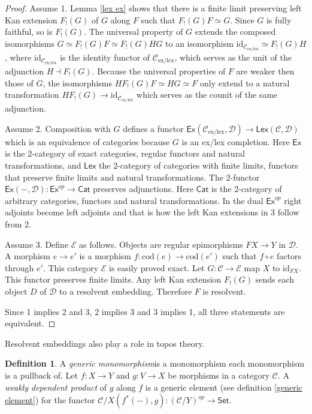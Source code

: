 \documentclass[sort&compress,draft]{elsarticle}
\theoremstyle{plain}
\theoremstyle{definition}
\newtheorem{definition}[theorem]{Definition}
\theoremstyle{remark}
\newcommand\hide[1]{}
\newcommand\key[1]{\emph{#1}\label{#1}}
\newcommand\cat\mathcal
\newcommand\exlex{_\mathrm{ex/lex}}\newcommand\exreg{_\mathrm{ex/reg}}
\newcommand\of:
\newcommand\ri{^*}
\newcommand\id{\mathrm{id}}
\newcommand\cod{\mathrm{cod}}
\newcommand\di{_!}
\newcommand\Cat\mathsf
\newcommand\dual{^{op}}
\newcommand\Set{\Cat{Set}}
\begin{document}
\begin{proof} 
Assume 1. Lemma \ref{lex ex} shows that there is a finite limit preserving left Kan extension $F\di(G)$ of $G$ along $F$ such that $F\di(G)F\simeq G$. Since $G$ is fully faithful, so is $F\di(G)$. The universal property of $G$ extends the composed isomorphisms $G \simeq F\di(G)F\simeq F\di(G)HG$ to an isomorphism $\id_{\cat C\exlex}\simeq F\di(G)H$, where $\id_{\cat C\exlex}$ is the identity functor of $\cat C\exlex$, which serves as the unit of the adjunction $H \dashv F\di(G)$. Because the universal properties of $F$ are weaker then those of $G$, the isomorphisms $HF\di(G)F\simeq HG\simeq F$ only extend to a natural transformation $HF\di(G)\to \id_{\cat C\exlex}$ which serves as the counit of the same adjunction.

Assume 2. Composition with $G$ defines a functor $\Cat{Ex}(\cat C\exlex,\cat D)\to\Cat{Lex}(\cat C,\cat D)$ which is an equivalence of categories because $G$ is an ex/lex completion. Here $\Cat{Ex}$ is the 2-category of exact categories, regular functors and natural transformations, and $\Cat{Lex}$ the 2-category of categories with finite limits, functors that preserve finite limits and natural transformations. The 2-functor $\Cat{Ex}(-,\cat D)\of\Cat{Ex}\dual\to\Cat{Cat}$ preserves adjunctions. Here $\Cat{Cat}$ is the 2-category of arbitrary categories, functors and natural transformations. In the dual $\Cat{Ex}\dual$ right adjoints become left adjoints and that is how the left Kan extensions in 3 follow from 2.
\hide{Is this acceptable? Would it (not) be better to move everything to the 2-categorical level?}

Assume 3. Define $\cat E$ as follows. Objects are regular epimorphisms $FX\to Y$ in $\cat D$. A morphism $e\to e'$ is a morphism $f\of\cod(e)\to\cod(e')$
such that $f\circ e$ factors through $e'$. This category $\cat E$ is easily proved exact. Let $G\of \cat C\to\cat E$ map $X$ to $\id_{FX}$. This functor preserves finite limits. Any left Kan extension $F\di(G)$ sends each object $D$ of $\cat D$ to a resolvent embedding. Therefore $F$ is resolvent.

Since 1 implies 2 and 3, 2 implies 3 and 3 implies 1, all three statements are equivalent.
\end{proof}

Resolvent embeddings also play a role in topos theory.

\begin{definition} A \key{generic monomorphism} is a monomorphism each monomorphism is a pullback of. Let $f:X \to Y$ and $g\of V\to X$ be morphisms in a category $\cat C$. A \key{weakly dependent product} of $g$ along $f$ is a generic element (see definition \ref{generic element}) for the functor $\cat C/X(f\ri(-),g)\of (\cat C/Y)\dual\to\Set$.\end{definition}
\end{document}
